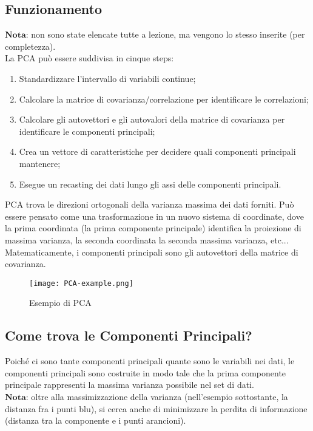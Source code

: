         \subsection{Funzionamento}
            $\textbf{Nota:}$ non sono state elencate tutte a lezione, ma vengono lo stesso inserite (per completezza).
            \\[1\baselineskip]
            La PCA può essere suddivisa in cinque steps:

            \begin{enumerate}
                \item Standardizzare l'intervallo di variabili continue;
                \item Calcolare la matrice di covarianza/correlazione per identificare le correlazioni;
                \item Calcolare gli autovettori e gli autovalori della matrice di covarianza per identificare le componenti principali;
                \item Crea un vettore di caratteristiche per decidere quali componenti principali mantenere;
                \item Esegue un recasting dei dati lungo gli assi delle componenti principali.
            \end{enumerate}
        
            PCA trova le direzioni ortogonali della varianza massima dei dati forniti.
            Può essere pensato come una trasformazione in un nuovo sistema di coordinate, dove la prima coordinata (la prima componente principale) identifica la proiezione di massima varianza, la seconda coordinata la seconda massima varianza, etc...
            \\[1\baselineskip]
            Matematicamente, i componenti principali sono gli autovettori della matrice di covarianza.

            \begin{figure}[h]
                \caption[short]{Esempio di PCA}
                \centering
                \texttt{[image: PCA-example.png]}
            \end{figure}
        
        \clearpage

        \subsection{Come trova le Componenti Principali?}
            Poiché ci sono tante componenti principali quante sono le variabili nei dati, le componenti principali sono costruite in modo tale che la prima componente principale rappresenti la massima varianza possibile nel set di dati.
            \\[1\baselineskip]
            $\textbf{Nota:}$ oltre alla massimizzazione della varianza (nell'esempio sottostante, la distanza fra i punti blu), si cerca anche di minimizzare la perdita di informazione (distanza tra la componente e i punti arancioni).
            
